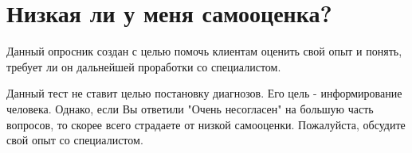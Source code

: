 \documentclass{survey}
\begin{document}

\section*{\huge{Низкая ли у меня самооценка?}}

\begin{flushleft}
    Данный опросник создан с целью помочь клиентам оценить свой опыт и понять, требует ли он дальнейшей проработки со специалистом.
\end{flushleft}






\begin{flushleft}
Данный тест не ставит целью постановку диагнозов. Его цель - информирование человека. Однако, если Вы ответили "Очень несогласен" на большую часть вопросов, то скорее всего страдаете от низкой самооценки. Пожалуйста, обсудите свой опыт со специалистом.
\end{flushleft}
\end{document}
